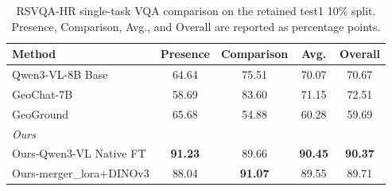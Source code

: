 \begin{table}[t]
  \caption{RSVQA-HR single-task VQA comparison on the retained test1 10\% split. Presence, Comparison, Avg., and Overall are reported as percentage points.}
  \label{tab:RSVQA_HR_single_task_vqa_test1}
  \vspace{5pt}
  \centering
  \scriptsize
  \setlength{\tabcolsep}{6pt}
  \renewcommand{\arraystretch}{1.08}
  \begin{tabular}{lcccc}
    \toprule
    Method & Presence & Comparison & Avg. & Overall \\
    \midrule
    Qwen3-VL-8B Base                    & 64.64          & 75.51          & 70.07          & 70.67          \\
    GeoChat-7B                         & 58.69          & 83.60          & 71.15          & 72.51          \\
    GeoGround                          & 65.68          & 54.88          & 60.28          & 59.69          \\
    \midrule
    \multicolumn{5}{l}{\textit{Ours}} \\
    Ours-Qwen3-VL Native FT            & \textbf{91.23} & 89.66          & \textbf{90.45} & \textbf{90.37} \\
    Ours-merger\_lora+DINOv3           & 88.04          & \textbf{91.07} & 89.55          & 89.71          \\
    \bottomrule
  \end{tabular}
\end{table}
